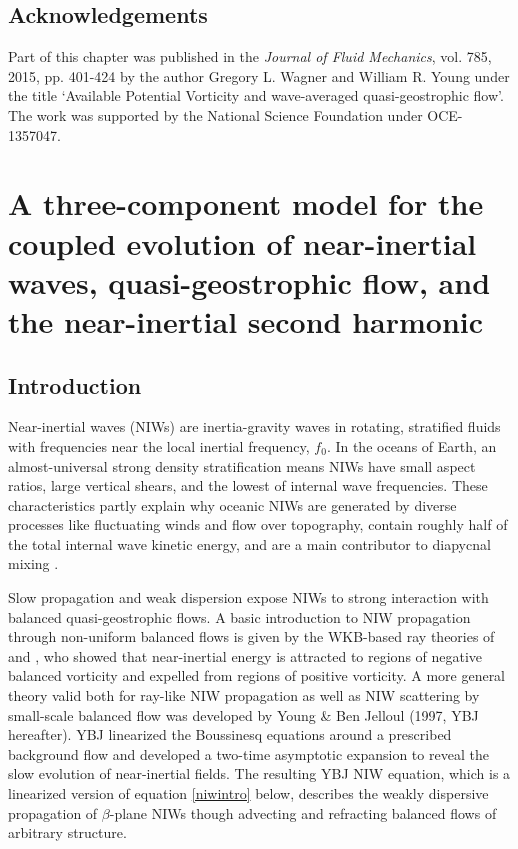 \documentclass[12pt, oneside]{book}
\begin{document}
\section*{Acknowledgements}

Part of this chapter was published in the \textit{Journal of Fluid Mechanics}, vol. 785, 2015, pp. 401-424 by the author Gregory L. Wagner and William R. Young under the title `Available Potential Vorticity and wave-averaged quasi-geostrophic flow'.  The work was supported by the National Science Foundation under OCE-1357047.

\let\cleardoublepage\relax \clearpage
\chapter{A three-component model for the coupled evolution of near-inertial waves, quasi-geostrophic flow, and the near-inertial second harmonic}
\label{threeComponentModelChapter}
\thispagestyle{preliminary}


\section{Introduction}
\label{introduction}

Near-inertial waves (NIWs) are inertia-gravity waves in rotating, stratified fluids with frequencies near the local inertial frequency, $f_0$.  In the oceans of Earth, an almost-universal strong density stratification means NIWs have small aspect ratios, large vertical shears, and the lowest of internal wave frequencies.  These characteristics partly explain why oceanic NIWs are generated by diverse processes like fluctuating winds and flow over topography, contain roughly half of the total internal wave kinetic energy, and are a main contributor to diapycnal mixing  \citep{Ferrari2009}.

Slow propagation and weak dispersion expose NIWs to strong interaction with balanced quasi-geostrophic flows.   A basic introduction to NIW propagation through non-uniform balanced flows is given by the WKB-based ray theories of \cite{M75} and \cite{K85}, who showed that near-inertial energy is attracted to regions of negative balanced vorticity and expelled from regions of positive vorticity.  A more general theory valid both for ray-like NIW propagation as well as NIW scattering by small-scale balanced flow was developed by Young \& Ben Jelloul \nocite{YBJ} (1997, YBJ hereafter).  YBJ linearized the Boussinesq equations around a prescribed background flow and developed a two-time asymptotic expansion to reveal the slow evolution of near-inertial fields.  The resulting YBJ NIW equation, which is a linearized version of equation \eqref{niwintro} below, describes the weakly dispersive propagation of $\beta$-plane NIWs though advecting and refracting balanced flows of arbitrary structure.
\end{document}
